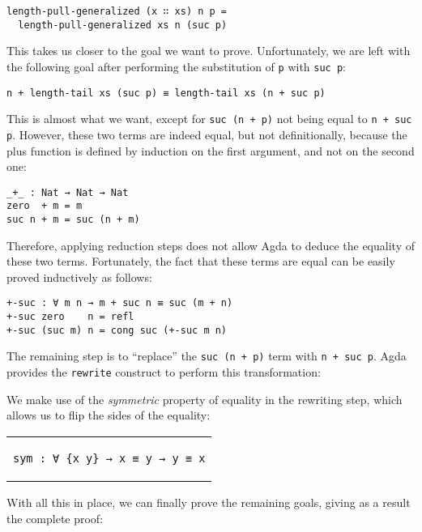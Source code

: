 \documentclass[runningheads]{llncs}
\begin{document}
\begin{lstlisting}
length-pull-generalized (x ∷ xs) n p =
  length-pull-generalized xs n (suc p)
\end{lstlisting}

This takes us closer to the goal we want to prove. Unfortunately, we are left with the
following goal after performing the substitution of \lstinline{p} with \lstinline{suc p}:

\begin{lstlisting}
n + length-tail xs (suc p) ≡ length-tail xs (n + suc p)
\end{lstlisting}

This is almost what we want, except for \lstinline{suc (n + p)} not being
equal to \lstinline{n + suc p}. However, these two terms are indeed equal, but not
definitionally, because the plus function is defined by induction on the first argument,
and not on the second one:

\begin{lstlisting}
_+_ : Nat → Nat → Nat
zero  + m = m
suc n + m = suc (n + m)
\end{lstlisting}

Therefore, applying reduction steps does not allow Agda to deduce the equality of these
two terms. Fortunately, the fact that these terms are equal can be easily proved
inductively as follows:

\begin{lstlisting}
+-suc : ∀ m n → m + suc n ≡ suc (m + n)
+-suc zero    n = refl
+-suc (suc m) n = cong suc (+-suc m n)
\end{lstlisting}

The remaining step is to ``replace'' the \lstinline{suc (n + p)} term with
\lstinline{n + suc p}. Agda provides the \lstinline{rewrite} construct to perform this
transformation:



We make use of the \emph{symmetric} property of equality in the rewriting step, which
allows us to flip the sides of the equality:

\begin{center}
\begin{tabular}{c}
\begin{lstlisting}
sym : ∀ {x y} → x ≡ y → y ≡ x
\end{lstlisting}
\end{tabular}
\end{center}

With all this in place, we can finally prove the remaining goals, giving as a result the
complete proof:
\end{document}
